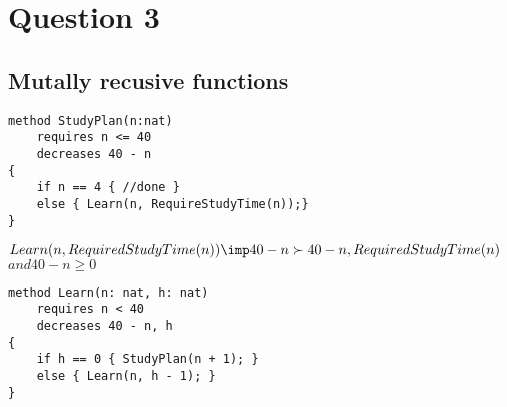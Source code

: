 \section{Question 3}

\subsection{Mutally recusive functions}

\begin{verbatim}
method StudyPlan(n:nat)
    requires n <= 40
    decreases 40 - n
{
    if n == 4 { //done }
    else { Learn(n, RequireStudyTime(n));}
}
\end{verbatim}

$Learn(n, RequiredStudyTime(n)) \imp 40 - n \succ 40-n, RequiredStudyTime(n)$
$and  40-n \geq 0$

\begin{verbatim}
method Learn(n: nat, h: nat) 
    requires n < 40
    decreases 40 - n, h
{
    if h == 0 { StudyPlan(n + 1); }
    else { Learn(n, h - 1); }
}
\end{verbatim}

